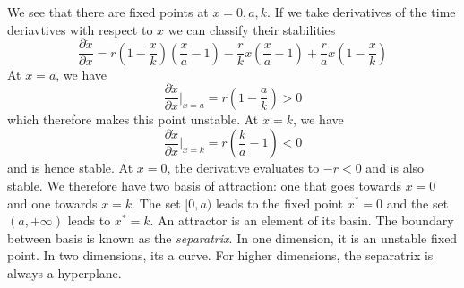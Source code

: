 \documentclass{article}
\newcommand{\pd}[2]{\frac{\partial #1}{\partial #2}}
\begin{document}
We see that there are fixed points at $x=0,a,k$. If we take derivatives of the time deriavtives with respect to $x$ we can classify their stabilities 
\begin{equation*}
    \pd{\dot x}{x} = r\left(1-\frac{x}{k}\right)\left(\frac{x}{a}-1\right)-\frac{r}{k}x\left(\frac{x}{a}-1\right) +\frac{r}{a}x\left(1-\frac{x}{k}\right)
\end{equation*}
At $x=a$, we have 
\begin{equation*}
    \pd{\dot x}{x} \Bigg|_{x=a} =r\left(1-\frac{a}{k}\right) >0 
\end{equation*}
which therefore makes this point unstable. At $x=k$, we have 
\begin{equation*}
    \pd{\dot x}{x} \Bigg|_{x=k} = r\left(\frac{k}{a}-1\right) <0
\end{equation*}
and is hence stable. At $x=0$, the derivative evaluates to $-r<0$ and is also stable. We therefore have two basis of attraction: one that goes towards $x=0$ and one towards $x=k$. The set $[0,a)$ leads to the fixed point $x^*=0$ and the set $(a,+\infty)$ leads to $x^*=k$. An attractor is an element of its basin. The boundary between basis is known as the \emph{separatrix}. In one dimension, it is an unstable fixed point. In two dimensions, its a curve. For higher dimensions, the separatrix is always a hyperplane.
\end{document}
